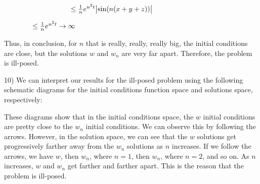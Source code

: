 \documentclass[executivepaper]{article}
\begin{document}
\begin{flushleft}
\begin{center}
\vspace{2mm}

$\hspace*{33mm} \leq \frac{1}{n} e^{n^{2} t} \abs{\sin(n(x+y+z))}$

\vspace{2mm}

$\hspace*{14mm} \leq \frac{1}{n} e^{n^{2} t} \rightarrow \infty$

\end{center}

Thus, in conclusion, for $n$ that is really, really, really big, the initial conditions are close, but the solutions $w$ and $w_{n}$ are very far apart. Therefore, the problem is ill-posed.

\end{flushleft}

\pagebreak

\begin{flushleft}

10) We can interpret our results for the ill-posed problem using the following schematic diagrams for the initial conditions function space and solutions space, respectively:

\vspace{120mm}

These diagrams show that in the initial conditions space, the $w$ initial conditions are pretty close to the $w_{n}$ initial conditions. We can observe this by following the arrows. However, in the solution space, we can see that the $w$ solutions get progressively farther away from the $w_{n}$ solutions as $n$ increases. If we follow the arrows, we have $w$, then $w_{n}$, where $n=1$, then $w_{n}$, where $n=2$, and so on. As $n$ increases, $w$ and $w_{n}$ get farther and farther apart. This is the reason that the problem is ill-posed.

\end{flushleft}
\end{document}

